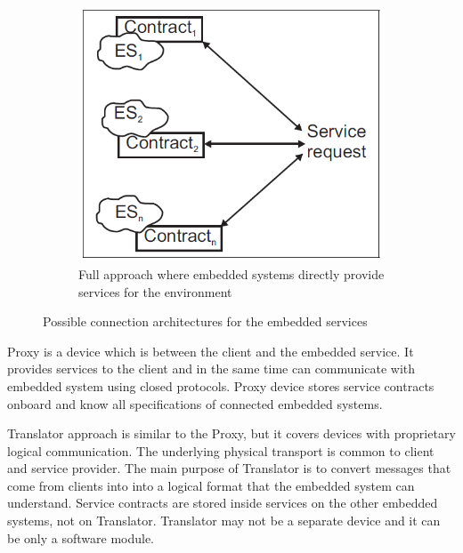 \begin{figure}[h]
\begin{subfigure}[b]{0.3\textwidth}
        \end{subfigure}
        ~ %
        \begin{subfigure}[b]{0.3\textwidth}
                \centering
                \includegraphics[width=\textwidth]{../images/implementation/full_arch.png}
                \caption{Full approach where embedded systems directly provide services for the environment}
                \label{fig:full_arch}
        \end{subfigure}
        \caption{Possible connection architectures for the embedded services}
        \label{fig:connection_architectures}
\end{figure}

Proxy is a device which is between the client and the embedded service. It
provides services to the client and in the same time can communicate with
embedded system using closed protocols. Proxy device stores service contracts
onboard and know all specifications of connected embedded systems. 

Translator approach is similar to the Proxy, but it covers devices with proprietary
logical communication. The underlying physical transport is common to client and
service provider. The main purpose of Translator is to convert messages that
come from clients into into a logical format that the embedded system
can understand. Service contracts are stored inside services on the other
embedded systems, not on Translator. Translator may not be a separate device and
it can be only a software module.

